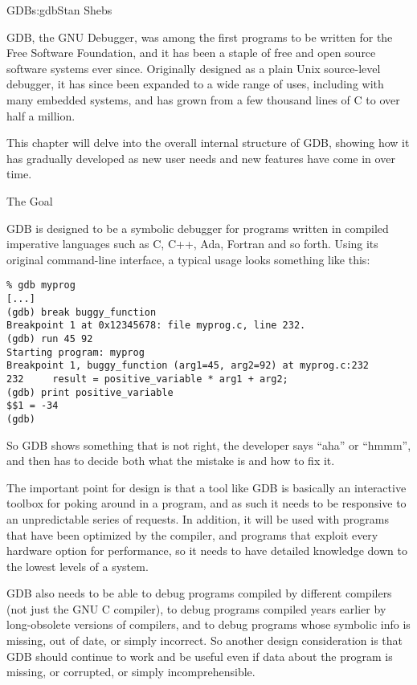 \begin{aosachapter}{GDB}{s:gdb}{Stan Shebs}

GDB, the GNU Debugger, was among the first programs to be written for
the Free Software Foundation, and it has been a staple of free and
open source software systems ever since.  Originally designed as a
plain Unix source-level debugger, it has since been expanded to a wide
range of uses, including with many embedded systems, and has grown from
a few thousand lines of C to over half a million.

This chapter will delve into the overall internal structure of GDB,
showing how it has gradually developed as new user needs and new
features have come in over time.

\begin{aosasect1}{The Goal}

GDB is designed to be a symbolic debugger for programs written in
compiled imperative languages such as C, C++, Ada, Fortran and so
forth.  Using its original command-line interface, a typical usage
looks something like this:

\begin{verbatim}
% gdb myprog
[...]
(gdb) break buggy_function
Breakpoint 1 at 0x12345678: file myprog.c, line 232.
(gdb) run 45 92
Starting program: myprog
Breakpoint 1, buggy_function (arg1=45, arg2=92) at myprog.c:232
232     result = positive_variable * arg1 + arg2;
(gdb) print positive_variable
$$1 = -34
(gdb)
\end{verbatim}

So GDB shows something that is not right, the developer says ``aha''
or ``hmmm'', and then has to decide both what the mistake is and how
to fix it.

The important point for design is that a tool like GDB is basically an
interactive toolbox for poking around in a program, and as such it
needs to be responsive to an unpredictable series of requests.  In
addition, it will be used with programs that have been optimized by
the compiler, and programs that exploit every hardware option for
performance, so it needs to have detailed knowledge down to the lowest
levels of a system.

GDB also needs to be able to debug programs compiled by different
compilers (not just the GNU C compiler), to debug programs compiled
years earlier by long-obsolete versions of compilers, and to debug
programs whose symbolic info is missing, out of date, or simply
incorrect.  So another design consideration is that GDB should
continue to work and be useful even if data about the program is
missing, or corrupted, or simply incomprehensible.


\end{aosasect1}
\end{aosachapter}
